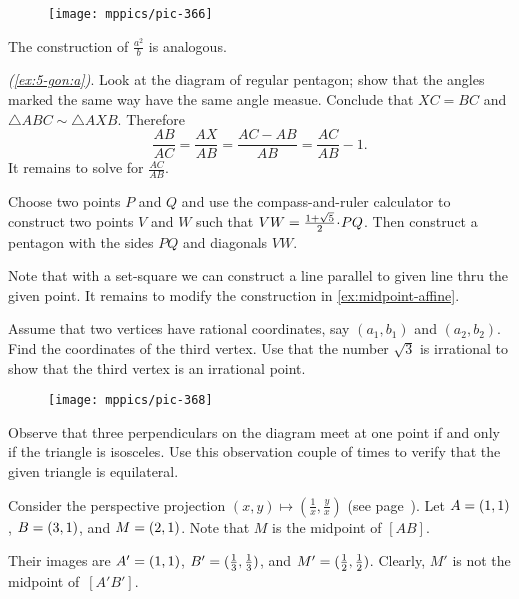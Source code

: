 {

\begin{wrapfigure}{r}{27mm}
\vskip-3mm
\centering
\texttt{[image: mppics/pic-366]}
\end{wrapfigure}

The construction of $\tfrac{a^2}b$ is analogous.


\parbf{\ref{ex:5-gon},} \textit{(\ref{ex:5-gon:a})}.
Look at the diagram of regular pentagon;
show that the angles marked the same way have the same angle measue.
Conclude that $XC=BC$ and $\triangle ABC\sim \triangle AXB$.
Therefore 
\[\frac{AB}{AC}=\frac{AX}{AB}=\frac{AC-AB}{AB}=\frac{AC}{AB}-1.\]
It remains to solve for $\frac{AC}{AB}$.

}

 Choose two points $P$ and $Q$ and use the compass-and-ruler calculator to construct two points $V$ and $W$ such that $VW\z=\tfrac{1+\sqrt5}2\cdot PQ$.
Then construct a pentagon with the sides $PQ$ and diagonals $VW$.

Note that with a set-square we can construct a line parallel to given line thru the given point.
It remains to modify the construction in \ref{ex:midpoint-affine}.

Assume that two vertices have rational coordinates, say $(a_1,b_1)$ and $(a_2,b_2)$.
Find the coordinates of the third vertex.
Use that the number $\sqrt{3}$ is irrational
to show that the third vertex is an irrational point.

{

\begin{wrapfigure}{r}{23mm}
\vskip-5mm
\centering
\texttt{[image: mppics/pic-368]}
\end{wrapfigure}

Observe that three perpendiculars on the diagram meet at one point if and only if the triangle is isosceles.
Use this observation couple of times to verify that the given triangle is equilateral.

Consider the perspective projection 
$(x,y)\mapsto (\tfrac 1x,\tfrac yx)$ (see page~\pageref{eq:(x,y)-perspective}).
Let $A\z=(1,1)$, $B\z=(3,1)$, and $M\z=(2,1)$.
Note that $M$ is the midpoint of $[AB]$.

Their images are $A'\z=(1,1)$, $B'\z=(\tfrac13,\tfrac13)$, and $M'\z=(\tfrac12,\tfrac12)$.
Clearly, $M'$ is not the midpoint of~$[A'B']$.

}

